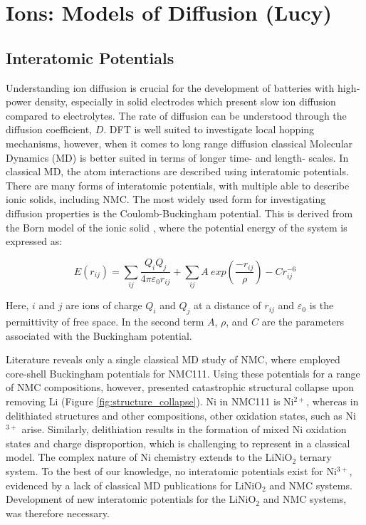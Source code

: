 \documentclass[journal=jacsat,manuscript=article]{achemso}
\begin{document}
\clearpage
\section{Ions: Models of Diffusion (Lucy)}
\subsection{Interatomic Potentials}
Understanding ion diffusion is crucial for the development of batteries with high‐power density, especially in solid electrodes which present slow ion diffusion compared to electrolytes. The rate of diffusion can be understood through the diffusion coefficient, $D$. DFT is well suited to investigate local hopping mechanisms, \cite{van_der_ven_layered_2001, van_der_ven_LiTiS2_2008} however, when it comes to long range diffusion classical Molecular Dynamics (MD) is better suited in terms of longer time- and length- scales. In classical MD, the atom interactions are described using interatomic potentials. There are many forms of interatomic potentials, with multiple able to describe ionic solids, including NMC. The most widely used form for investigating diffusion properties is the Coulomb-Buckingham potential. \cite{buckingham_classical_1938} This is derived from the Born model of the ionic solid \cite{born_1932, mayer_1932}, where the potential energy of the system is expressed as:

\begin{equation}
    E(r_{ij}) =  \sum_{ij} \frac{Q_i Q_j}{4\pi \varepsilon_0 r_{ij}} + \sum_{ij} A \ exp(\frac{-r_{ij}}{\rho}) - Cr_{ij}^{-6}
\end{equation}

Here, $i$ and $j$ are ions of charge $Q_i$ and $Q_j$ at a distance of $r_{ij}$ and $\varepsilon_0$ is the permittivity of free space. In the second term $A$, $\rho$, and $C$ are the parameters associated with the Buckingham potential.

Literature reveals only a single classical MD study of NMC, where \citeauthor{Lee_and_Park_2012} employed core-shell Buckingham potentials for NMC111. \cite{Lee_and_Park_2012} Using these potentials for a range of NMC compositions, however, presented  catastrophic structural collapse upon removing Li (Figure \ref{fig:structure_collapse}). Ni in NMC111 is Ni$^{2+}$, whereas in delithiated structures and other compositions, other oxidation states, such as Ni$^{3+}$ arise. Similarly, delithiation results in the formation of mixed Ni oxidation states and charge disproportion, which is challenging to represent in a classical model. \cite{Nakamura_2019,Kim_2002,Alonso_1999} The complex nature of Ni chemistry extends to the LiNiO$_2$ ternary system. To the best of our knowledge, no interatomic potentials exist for Ni$^{3+}$, evidenced by a lack of classical MD publications for LiNiO$_2$ and NMC systems. Development of new interatomic potentials for the LiNiO$_2$ and NMC systems, was therefore necessary.
\end{document}
